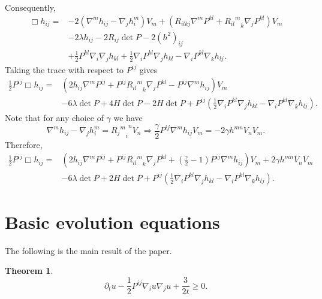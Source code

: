\documentclass{amsart}
\newtheorem{theorem}{Theorem}
\theoremstyle{definition}
\theoremstyle{remark}
\numberwithin{equation}{section}
\begin{document}
Consequently,
\begin{align*}
\Box h_{ij}=&-2(\nabla^mh_{ij}-\nabla_jh_i^m)V_m+(R_{ilkj}\nabla^mP^{kl}+{{R_{il}}^m}_k\nabla_jP^{kl})V_m\\
&-2\lambda h_{ij}-2R_{ij}\det P-2(h^2)_{ij}\\
&+\frac{1}{2}P^{kl}\nabla_i\nabla_j h_{kl}+\frac{1}{2}\nabla_iP^{kl}\nabla_j h_{kl}-\nabla_iP^{kl}\nabla_k h_{lj}.
\end{align*}
Taking the trace with respect to $P^{ij}$  gives
\begin{align*}
\frac{1}{2}P^{ij}\Box h_{ij}=&(2h_{ij}\nabla^mP^{ij}+P^{ij}{{R_{il}}^m}_k\nabla_jP^{kl}-P^{ij}\nabla^mh_{ij})V_m\\
&-6\lambda \det P+4H\det P-2H\det P+P^{ij}\left(\frac{1}{2}\nabla_iP^{kl}\nabla_j h_{kl}-\nabla_iP^{kl}\nabla_k h_{lj}\right).
\end{align*}
Note that for any choice of $\gamma$ we have
\[\nabla^mh_{ij}-\nabla_jh_i^m={{{R_j}^{m}}_{i}}^nV_n\Rightarrow \frac{\gamma}{2}P^{ij}\nabla^mh_{ij}V_m=-2\gamma h^{mn}V_nV_m.\]
Therefore,
\begin{align*}
\frac{1}{2}P^{ij}\Box h_{ij}=&\left(2h_{ij}\nabla^mP^{ij}+P^{ij}{{R_{il}}^m}_k\nabla_jP^{kl}+(\frac{\gamma}{2}-1)P^{ij}\nabla^mh_{ij}\right)V_m+2\gamma h^{mn}V_nV_m\\
&-6\lambda \det P+2H\det P+ P^{ij}\left(\frac{1}{2}\nabla_iP^{kl}\nabla_j h_{kl}-\nabla_iP^{kl}\nabla_k h_{lj}\right).
\end{align*}

\section{Basic evolution equations}
The following is the main result of the paper.
\begin{theorem}
\[\partial_t u-\frac{1}{2}P^{ij}\nabla_iu\nabla_ju+\frac{3}{2t}\geq 0. \]
\end{theorem}
\end{document}
